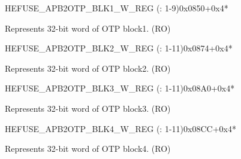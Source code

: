 \begin{register}{H}{EFUSE\_APB2OTP\_BLK1\_W\_REG (: 1-9)}{0x0850+0x4*}\label{regdesc:EFUSEAPB2OTPBLK1WNREG}
%
\regnewline%
\begin{regdesc}\begin{reglist}
\label{fielddesc:EFUSEAPB2OTPBLOCK1WN}\item [EFUSE\_APB2OTP\_BLOCK1\_W\regindex{n}] Represents 32-bit word  of OTP block1. (RO)
\end{reglist}\end{regdesc}
\end{register}


\begin{register}{H}{EFUSE\_APB2OTP\_BLK2\_W\_REG (: 1-11)}{0x0874+0x4*}\label{regdesc:EFUSEAPB2OTPBLK2WNREG}
%
\regnewline%
\begin{regdesc}\begin{reglist}
\label{fielddesc:EFUSEAPB2OTPBLOCK2WN}\item [EFUSE\_APB2OTP\_BLOCK2\_W\regindex{n}] Represents 32-bit word  of OTP block2. (RO)
\end{reglist}\end{regdesc}
\end{register}

\begin{register}{H}{EFUSE\_APB2OTP\_BLK3\_W\_REG (: 1-11)}{0x08A0+0x4*}\label{regdesc:EFUSEAPB2OTPBLK3WNREG}
%
\regnewline%
\begin{regdesc}\begin{reglist}
\label{fielddesc:EFUSEAPB2OTPBLOCK3WN}\item [EFUSE\_APB2OTP\_BLOCK3\_W\regindex{n}] Represents 32-bit word  of OTP block3. (RO)
\end{reglist}\end{regdesc}
\end{register}

\begin{register}{H}{EFUSE\_APB2OTP\_BLK4\_W\_REG (: 1-11)}{0x08CC+0x4*}\label{regdesc:EFUSEAPB2OTPBLK4WNREG}
%
\regnewline%
\begin{regdesc}\begin{reglist}
\label{fielddesc:EFUSEAPB2OTPBLOCK4WN}\item [EFUSE\_APB2OTP\_BLOCK4\_W\regindex{n}] Represents 32-bit word  of OTP block4. (RO)
\end{reglist}\end{regdesc}
\end{register}

